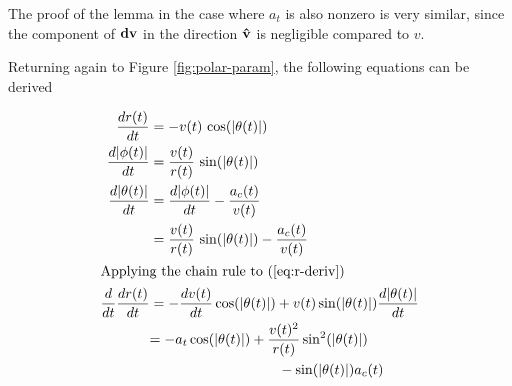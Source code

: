 The proof of the lemma in the case where $a_t$ is also nonzero is very similar, since the component of $\mathbf{dv}$ in the direction $\mathbf{\hat{v}}$ is negligible compared to $v$.

Returning again to Figure \ref{fig:polar-param}, the following equations can be derived

\begin{align}
  \frac{dr(t)}{dt}& = -v(t) \, \cos\paren{\abs{\theta(t)}}\label{eq:r-deriv}\\
  \frac{d\abs{\phi(t)}}{dt}& = \frac{v(t)}{r(t)} \, \sin\paren{\abs{\theta(t)}}\label{eq:phi-deriv}\\
  \frac{d\abs{\theta(t)}}{dt}& = \frac{d\abs{\phi(t)}}{dt} - \frac{a_c(t)}{v(t)}\\
  &= \frac{v(t)}{r(t)} \, \sin\paren{\abs{\theta(t)}} - \frac{a_c(t)}{v(t)}\label{eq:theta-deriv}\\
  \intertext{Applying the chain rule to (\ref{eq:r-deriv})}
  \frac{d}{dt} \frac{dr(t)}{dt}& = -\frac{dv(t)}{dt} \cos\paren{\abs{\theta(t)}} + v(t) \sin\paren{\abs{\theta(t)}} \frac{d\abs{\theta(t)}}{dt}\\
  &\begin{aligned}
    = -a_t \cos\paren{\abs{\theta(t)}} &+ \frac{v(t)^2}{r(t)} \sin^2\paren{\abs{\theta(t)}}\\
    &\qquad - \sin\paren{\abs{\theta(t)}} a_c(t) \label{eq:r-deriv-2}
  \end{aligned}
\end{align}
